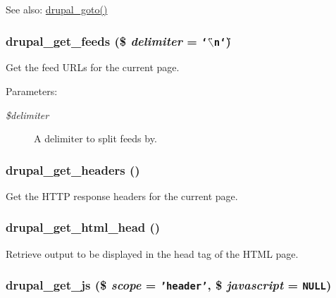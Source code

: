 \begin{Desc}
\item[See also:]\hyperlink{common_8inc_74b81f841dbbac5a119a9cc7e3ffc614}{drupal\_\-goto()} \end{Desc}
\hypertarget{common_8inc_c7df9703641369003434d49cf917c16e}{
\subsubsection[{drupal\_\-get\_\-feeds}]{\setlength{\rightskip}{0pt plus 5cm}drupal\_\-get\_\-feeds (\$ {\em delimiter} = {\tt \char`\"{}$\backslash$n\char`\"{}})}}
\label{common_8inc_c7df9703641369003434d49cf917c16e}


Get the feed URLs for the current page.

\begin{Desc}
\item[Parameters:]
\begin{description}
\item[{\em \$delimiter}]A delimiter to split feeds by. \end{description}
\end{Desc}
\hypertarget{common_8inc_940dc177a758d9aa97e7e88a4cb839ca}{
\subsubsection[{drupal\_\-get\_\-headers}]{\setlength{\rightskip}{0pt plus 5cm}drupal\_\-get\_\-headers ()}}
\label{common_8inc_940dc177a758d9aa97e7e88a4cb839ca}


Get the HTTP response headers for the current page. \hypertarget{common_8inc_cdee011d76859a5a9280209df1175188}{
\subsubsection[{drupal\_\-get\_\-html\_\-head}]{\setlength{\rightskip}{0pt plus 5cm}drupal\_\-get\_\-html\_\-head ()}}
\label{common_8inc_cdee011d76859a5a9280209df1175188}


Retrieve output to be displayed in the head tag of the HTML page. \hypertarget{common_8inc_56994274f0ab2fb17c15b41bcdbd81ce}{
\subsubsection[{drupal\_\-get\_\-js}]{\setlength{\rightskip}{0pt plus 5cm}drupal\_\-get\_\-js (\$ {\em scope} = {\tt 'header'}, \/  \$ {\em javascript} = {\tt NULL})}}
\label{common_8inc_56994274f0ab2fb17c15b41bcdbd81ce}


